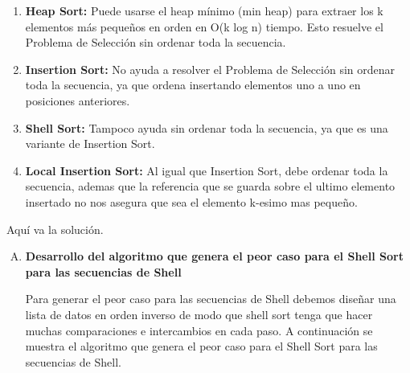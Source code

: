 \documentclass[answers, 10pt]{exam}
\begin{document}
\begin{questions}
\begin{solution}
\begin{enumerate}
      \item \textbf{Heap Sort:} Puede usarse el heap mínimo (min heap) para
            extraer los k elementos más pequeños en orden en O(k log n) tiempo. Esto
            resuelve el Problema de Selección sin ordenar toda la secuencia.

      \item \textbf{Insertion Sort:} No ayuda a resolver el Problema de Selección
            sin ordenar toda la secuencia, ya que ordena insertando elementos uno a uno
            en posiciones anteriores.

      \item \textbf{Shell Sort:} Tampoco ayuda sin ordenar toda la secuencia, ya
            que es una variante de Insertion Sort.

      \item \textbf{Local Insertion Sort:} Al igual que Insertion Sort, debe
            ordenar toda la secuencia, ademas que la referencia que se guarda sobre el
            ultimo elemento insertado no nos asegura que sea el elemento k-esimo mas
            pequeño.
    \end{enumerate}
  \end{solution}
  \begin{solution}
    Aquí va la solución.
  \end{solution}
  \begin{solution}
    \begin{enumerate}[(A)]
      \item \textbf{Desarrollo del algoritmo que genera el peor caso para el Shell Sort para las secuencias de Shell}

            Para generar el peor caso para las secuencias de Shell debemos diseñar una
            lista de datos en orden inverso de modo que shell sort tenga que hacer
            muchas comparaciones e intercambios en cada paso. A continuación se muestra
            el algoritmo que genera el peor caso para el Shell Sort para las secuencias
            de Shell.


\end{enumerate}
\end{solution}
\end{questions}
\end{document}
